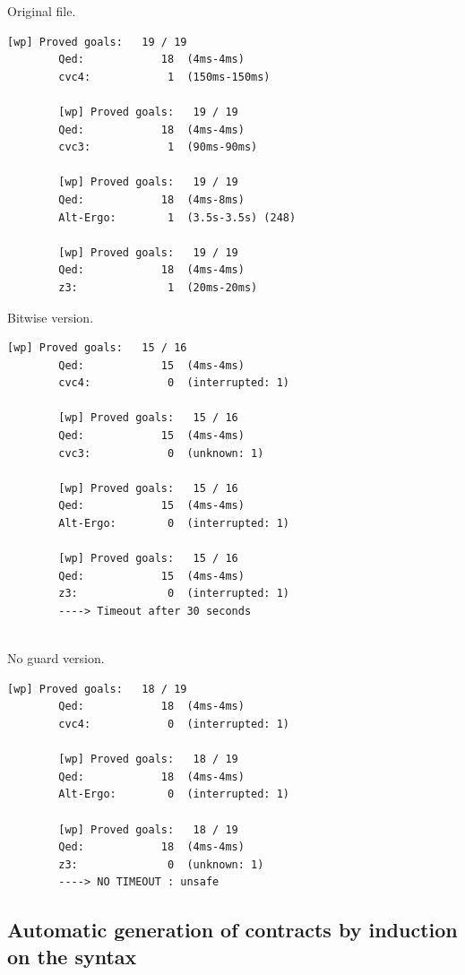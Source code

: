 \documentclass[a4paper,11pt,final]{article}
\begin{document}
	\begin{minipage}{\textwidth}
	\begin{multicols}{3}
		Original file.
		\begin{lstlisting}[basicstyle=\tiny]
		[wp] Proved goals:   19 / 19
		Qed:            18  (4ms-4ms)
		cvc4:            1  (150ms-150ms)
		
		[wp] Proved goals:   19 / 19
		Qed:            18  (4ms-4ms)
		cvc3:            1  (90ms-90ms)
		
		[wp] Proved goals:   19 / 19
		Qed:            18  (4ms-8ms)
		Alt-Ergo:        1  (3.5s-3.5s) (248)
		
		[wp] Proved goals:   19 / 19
		Qed:            18  (4ms-4ms)
		z3:              1  (20ms-20ms)
		\end{lstlisting}
		\columnbreak
		Bitwise version.
		\begin{lstlisting}[basicstyle=\tiny]
		[wp] Proved goals:   15 / 16
		Qed:            15  (4ms-4ms)
		cvc4:            0  (interrupted: 1)
		
		[wp] Proved goals:   15 / 16
		Qed:            15  (4ms-4ms)
		cvc3:            0  (unknown: 1)
		
		[wp] Proved goals:   15 / 16
		Qed:            15  (4ms-4ms)
		Alt-Ergo:        0  (interrupted: 1)
		
		[wp] Proved goals:   15 / 16
		Qed:            15  (4ms-4ms)
		z3:              0  (interrupted: 1)    
		----> Timeout after 30 seconds
		
		\end{lstlisting}
		\columnbreak
		No guard version.
		\begin{lstlisting}[basicstyle=\tiny]
		[wp] Proved goals:   18 / 19
		Qed:            18  (4ms-4ms)
		cvc4:            0  (interrupted: 1)
		
		[wp] Proved goals:   18 / 19
		Qed:            18  (4ms-4ms)
		Alt-Ergo:        0  (interrupted: 1)
		
		[wp] Proved goals:   18 / 19
		Qed:            18  (4ms-4ms)
		z3:              0  (unknown: 1)   
		----> NO TIMEOUT : unsafe
		\end{lstlisting}
	\end{multicols}
	\end{minipage}
	
	\subsection{Automatic generation of contracts by induction on the syntax}
	
\end{document}
